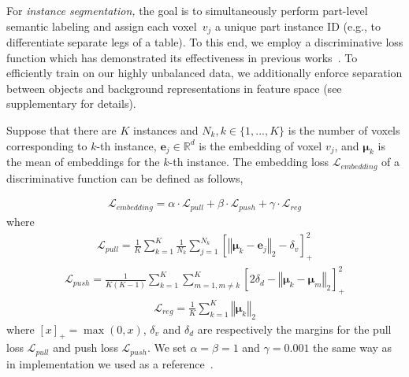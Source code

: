 



For \emph{instance segmentation,} the goal is to simultaneously perform part-level semantic labeling and assign each voxel~$v_j$ a unique part instance ID (e.g., to differentiate separate legs of a table).
To this end, we employ a discriminative loss function which has demonstrated its effectiveness in previous works~\cite{de2017semantic,pham2019jsis3d}.
To efficiently train on our highly unbalanced data, we additionally enforce separation between objects and background representations in feature space (see supplementary for details).

Suppose that there are $K$ instances and $N_k, k\in\{1,...,K\}$ is the number of voxels corresponding to $k$-th instance, $\mathbf{e}_j \in \mathbb{R}^d$ is the embedding of voxel $v_j$, and $\boldsymbol\mu_k$ is the mean of embeddings for the $k$-th instance. The embedding loss $\mathcal{L}_{embedding}$ of a discriminative function can be defined as follows,

\begin{align}
  \label{eq:discriminative}
  \mathcal{L}_{embedding} = \alpha \cdot \mathcal{L}_{pull} + \beta \cdot \mathcal{L}_{push} + \gamma \cdot \mathcal{L}_{reg}
\end{align}
where
\begin{align}
  \label{eq:pull}
  \mathcal{L}_{pull} = \frac{1}{K} \sum_{k=1}^K \frac{1}{N_k} \sum_{j=1}^{N_k} \left [ \left \Vert \boldsymbol\mu_k - \mathbf{e}_j \right \Vert_2 - \delta_v \right ]^2_+
\end{align}
\begin{align}
  \label{eq:push}
  \mathcal{L}_{push} = \frac{1}{K(K-1)} \sum_{k=1}^K \sum_{m=1, m \neq k}^K \left [2\delta_d - \left \Vert \boldsymbol\mu_k - \boldsymbol\mu_m \right \Vert_2 \right ]^2_+
\end{align}
\begin{align}
  \label{eq:reg}
  \mathcal{L}_{reg} = \frac{1}{K} \sum_{k=1}^K \left \Vert \boldsymbol\mu_k \right \Vert_2
\end{align}
where $[x]_+=\max(0,x)$, $\delta_v$ and $\delta_d$ are respectively the margins for the pull loss $\mathcal{L}_{pull}$ and push loss $\mathcal{L}_{push}$. We set $\alpha = \beta = 1$ and $\gamma = 0.001$ the same way as in implementation we used as a reference~\cite{pham2019jsis3d}.

